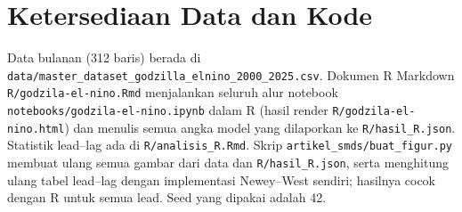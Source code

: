 \documentclass[11pt,twoside]{article}
\begin{document}

\printbibliography[title={Daftar Pustaka}]

\appendix

\section{Ketersediaan Data dan Kode}
\label{Sec:SuppA}

\sloppy
Data bulanan (312 baris) berada di \texttt{data/master\_dataset\_godzilla\_elnino\_2000\_2025.csv}. Dokumen R Markdown \texttt{R/godzila-el-nino.Rmd} menjalankan seluruh alur notebook \texttt{notebooks/godzila-el-nino.ipynb} dalam R (hasil render \texttt{R/godzila-el-nino.html}) dan menulis semua angka model yang dilaporkan ke \texttt{R/hasil\_R.json}. Statistik lead--lag ada di \texttt{R/analisis\_R.Rmd}. Skrip \texttt{artikel\_smds/buat\_figur.py} membuat ulang semua gambar dari data dan \texttt{R/hasil\_R.json}, serta menghitung ulang tabel lead--lag dengan implementasi Newey--West sendiri; hasilnya cocok dengan R untuk semua lead. Seed yang dipakai adalah 42.
\end{document}
